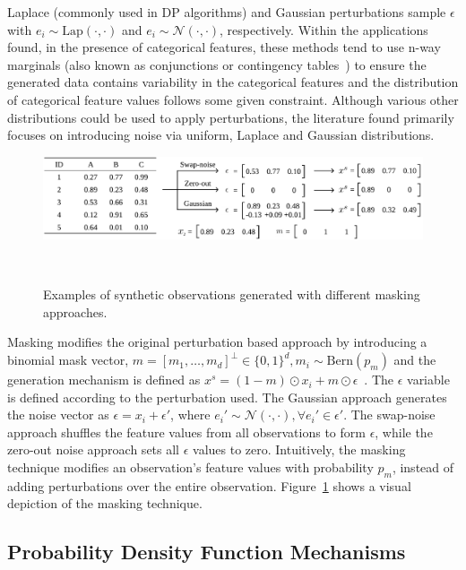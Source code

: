 Laplace (commonly used in DP algorithms) and Gaussian perturbations sample
$\epsilon$ with $e_i \sim \text{Lap}(\cdot, \cdot)$ and $e_i \sim
\mathcal{N}(\cdot, \cdot)$, respectively. Within the applications found, in
the presence of categorical features, these methods tend to use n-way
marginals (also known as conjunctions or contingency
tables~\cite{gaboardi2014dual}) to ensure the generated data contains
variability in the categorical features and the distribution of categorical
feature values follows some given constraint.  Although various other
distributions could be used to apply perturbations, the literature found
primarily focuses on introducing noise via uniform, Laplace and Gaussian
distributions.

\begin{figure}
	\centering
	\includegraphics[width=1\linewidth]{masking-example}
    \caption{Examples of synthetic observations generated with different
        masking approaches.
    }~\label{fig:masking-example}
\end{figure}

Masking modifies the original perturbation based approach by introducing a
binomial mask vector, $m = [m_1, \ldots, m_d]^\bot \in \{0,1\}^d, m_i \sim
\text{Bern}(p_m)$ and the generation mechanism is defined as $x^s = (1 -
m)\odot x_i + m \odot \epsilon$~\cite{yoon2020vime}. The $\epsilon$ variable
is defined according to the perturbation used. The Gaussian approach generates
the noise vector as $\epsilon = x_i + \epsilon'$, where $e_i' \sim
\mathcal{N}(\cdot, \cdot), \forall e_i' \in \epsilon'$. The swap-noise
approach shuffles the feature values from all observations to form
$\epsilon$, while the zero-out noise approach sets all $\epsilon$ values to
zero. Intuitively, the masking technique modifies an observation's feature
values with probability $p_m$, instead of adding perturbations over the
entire observation. Figure~\ref{fig:masking-example} shows a visual depiction
of the masking technique.

\subsection{Probability Density Function Mechanisms}

